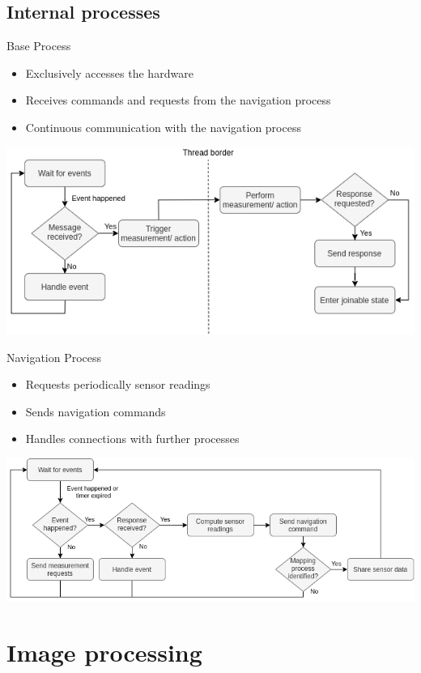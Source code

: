 \documentclass{beamer}
\begin{document}
\subsection{Internal processes}

\begin{frame}{Base Process}
\begin{itemize}
\item Exclusively accesses the hardware
\item Receives commands and requests from the navigation process
\item Continuous communication with the navigation process
\end{itemize}
\pause
\centering
\includegraphics[scale=0.45]{sources/flowchart_base.png}
\end{frame}

\begin{frame}{Navigation Process}
\begin{itemize}
\item Requests periodically sensor readings
\item Sends navigation commands
\item Handles connections with further processes
\end{itemize}
\pause
\centering
\includegraphics[scale=0.43]{sources/flowchart_navigation.png}
\end{frame}

\section{Image processing}
\end{document}
